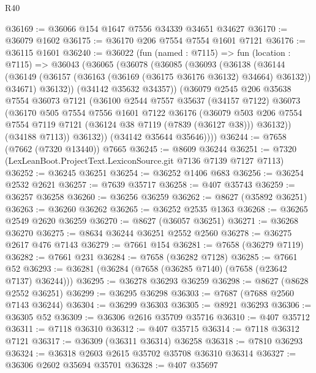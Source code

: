 \begin{lexlean}{R40}
\begin{coremodule}
@36169 := @36066 @154 @1647 @7556 @34339 @34651 @34627
@36170 := @36079 @1602
@36175 := @36170 @206 @7554 @7554 @1601 @7121
@36176 := @36115 @1601
@36240 := @36022
    (fun (named : @7115) =>
    fun (location : @7115) =>
    @36043
      (@36065
        (@36078
          (@36085
            (@36093
              (@36138
                (@36144
                  (@36149 (@36157 (@36163 (@36169 (@36175 @36176 @36132) @34664) @36132)) @34671)
                  @36132))
              (@34142 @35632 @34357))
            (@36079
              @2545
              @206
              @35638
              @7554
              @36073
              @7121
              (@36100
                @2544
                @7557
                @35637
                (@34157 @7122)
                @36073
                (@36170
                  @505
                  @7554
                  @7556
                  @1601
                  @7122
                  @36176
                  (@36079
                    @503
                    @206
                    @7554
                    @7554
                    @7119
                    @7121
                    (@36124 @38 @7119 (@7839 (@36127 @38)))
                    @36132))
                (@34188 @7113))
              @36132))
          (@34142 @35644 @35646))))
@36244 := @7658 (@7662 (@7320 @13440)) @7665
@36245 := @8609 @36244
@36251 := @7320 (LexLeanBoot.ProjectText.LexiconSource.git @7136 @7139 @7127 @7113)
@36252 := @36245 @36251
@36254 := @36252 @1406 @683
@36256 := @36254 @2532 @2621
@36257 := @7639 @35717
@36258 := @407 @35743
@36259 := @36257 @36258
@36260 := @36256 @36259
@36262 := @8627 (@35892 @36251)
@36263 := @36260 @36262
@36265 := @36252 @2535 @1363
@36268 := @36265 @2549 @2620 @36259
@36270 := @8627 (@36057 @36251)
@36271 := @36268 @36270
@36275 := @8634 @36244 @36251 @2552 @2560
@36278 := @36275 @2617 @476 @7143
@36279 := @7661 @154
@36281 := @7658 (@36279 @7119)
@36282 := @7661 @231
@36284 := @7658 (@36282 @7128)
@36285 := @7661 @52
@36293 := @36281 (@36284 (@7658 (@36285 @7140) (@7658 (@23642 @7137) @36244)))
@36295 := @36278 @36293 @36259
@36298 := @8627 (@8628 @2552 @36251)
@36299 := @36295 @36298
@36303 := @7687 (@7688 @2560 @7143 @36244)
@36304 := @36299 @36303
@36305 := @8921 @36293
@36306 := @36305 @52
@36309 := @36306 @2616 @35709 @35716
@36310 := @407 @35712
@36311 := @7118 @36310
@36312 := @407 @35715
@36314 := @7118 @36312 @7121
@36317 := @36309 (@36311 @36314) @36258
@36318 := @7810 @36293
@36324 := @36318 @2603 @2615 @35702 @35708 @36310 @36314
@36327 := @36306 @2602 @35694 @35701
@36328 := @407 @35697

\end{coremodule}
\end{lexlean}

